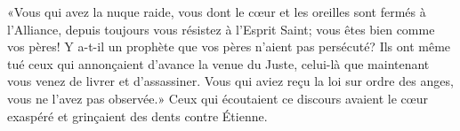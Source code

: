 «Vous qui avez la nuque raide,
	vous dont le cœur et les oreilles sont fermés à l’Alliance,
	depuis toujours vous résistez à l’Esprit Saint;
	vous êtes bien comme vos pères!
Y a-t-il un prophète que vos pères n’aient pas persécuté?
Ils ont même tué ceux qui annonçaient d’avance la venue du Juste,
	celui-là que maintenant vous venez de livrer et d’assassiner.
Vous qui aviez reçu la loi sur ordre des anges, vous ne l’avez pas observée.»
Ceux qui écoutaient ce discours avaient le cœur exaspéré
	et grinçaient des dents contre Étienne.

